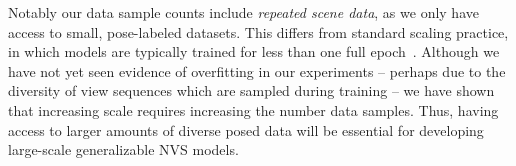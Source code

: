 


Notably our data sample counts include \emph{repeated scene data}, as we only have access to small, pose-labeled datasets. This differs from standard scaling practice, in which models are typically trained for less than one full epoch~\citep{hoffmann2022training, kaplan2020scaling, zhai2022scaling}. Although we have not yet seen evidence of overfitting in our experiments -- perhaps due to the diversity of view sequences which are sampled during training -- we have shown that increasing scale requires increasing the number data samples. Thus, having access to larger amounts of diverse posed data will be essential for developing large-scale generalizable NVS models.
\vspace{-1\baselineskip}
















